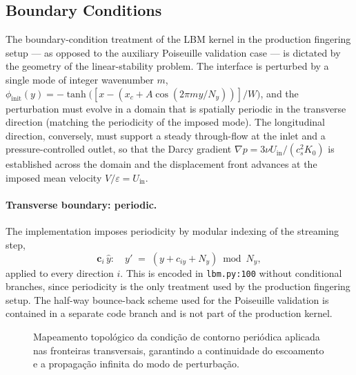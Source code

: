 \subsection{Boundary Conditions}

The boundary-condition treatment of the LBM kernel in the production fingering setup --- as opposed to the auxiliary Poiseuille validation case --- is dictated by the geometry of the linear-stability problem.
The interface is perturbed by a single mode of integer wavenumber $m$, $\phi_{\mathrm{init}}(y) = -\tanh\bigl([x - (x_c + A\cos(2\pi m y/N_y))]/W\bigr)$, and the perturbation must evolve in a domain that is spatially periodic in the transverse direction (matching the periodicity of the imposed mode).
The longitudinal direction, conversely, must support a steady through-flow at the inlet and a pressure-controlled outlet, so that the Darcy gradient $\nabla p = 3\nu U_{\mathrm{in}}/(c_s^{2} K_0)$ is established across the domain and the displacement front advances at the imposed mean velocity $V/\varepsilon = U_{\mathrm{in}}$.

\paragraph{Transverse boundary: periodic.}
The implementation imposes periodicity by modular indexing of the streaming step,
\begin{equation}
\bm{c}_i\,\hat{y} : \quad y' \;=\; (y + c_{iy} + N_y) \bmod N_y,
\end{equation}
applied to every direction $i$.
This is encoded in \texttt{lbm.py:100} without conditional branches, since periodicity is the only treatment used by the production fingering setup.
The half-way bounce-back scheme used for the Poiseuille validation is contained in a separate code branch and is not part of the production kernel.

\begin{figure}[H]
    \centering
    \caption{Mapeamento topológico da condição de contorno periódica aplicada nas fronteiras transversais, garantindo a continuidade do escoamento e a propagação infinita do modo de perturbação.}
    \label{fig:periodic-transverse-bc}
\end{figure}


